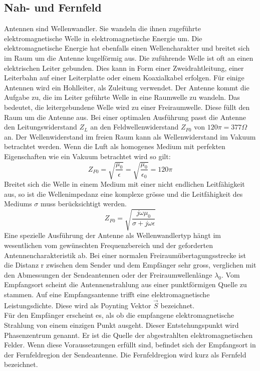 \newpage
\subsection{Nah- und Fernfeld}
Antennen sind Wellenwandler. Sie wandeln die ihnen zugeführte elektromagnetische Welle in  elektromagnetische Energie um. Die elektromagnetische Energie hat ebenfalls einen Wellencharakter und breitet  sich im Raum um die Antenne kugelförmig aus. Die zuführende Welle ist oft an einen elektrischen Leiter gebunden. Dies kann in Form einer Zweidrahtleitung, einer Leiterbahn auf einer Leiterplatte oder einem Koaxialkabel erfolgen.  Für einige Antennen wird ein Hohlleiter, als Zuleitung verwendet. 
Der Antenne kommt die Aufgabe zu, die im Leiter geführte Welle in eine Raumwelle zu wandeln. Das bedeutet, die leitergebundene Welle wird zu einer Freiraumwelle. Diese füllt den Raum um die Antenne aus. 
Bei einer optimalen Ausführung passt die Antenne den Leitungswiderstand $Z_{L}$ an den Feldwellenwiderstand $Z_{F0}$ von $120\pi = 377 \Omega$ an. Der Wellenwiderstand im freien Raum kann als Wellenwiderstand im Vakuum betrachtet werden. Wenn die Luft als homogenes Medium mit perfekten Eigenschaften wie ein Vakuum betrachtet wird so gilt:
\begin{equation}\label{eq:Wellenimpedanz}
Z_{F0}=\sqrt{\dfrac{\mu_{0}}{\epsilon}}=\sqrt{\dfrac{\mu_{0}}{\epsilon_{0}}}=120\pi
\end{equation}
Breitet sich die Welle in einem Medium mit einer nicht endlichen Leitfähigkeit aus, so ist die Wellenimpedanz eine komplexe grösse und die Leitfähigkeit des Mediums $\sigma$ muss berücksichtigt werden.
\begin{equation}\label{eq:Wellenimpedanz}
Z_{F0}=\sqrt{\dfrac{j\omega\mu_{0}}{\sigma+j\omega\epsilon}}
\end{equation}
Eine spezielle Ausführung der Antenne als Wellenwandlertyp hängt im wesentlichen vom gewünschten Frequenzbereich und der geforderten Antennencharakteristik ab. Bei einer normalen Freiraumübertagungsstrecke ist die Distanz r zwischen dem Sender und dem Empfänger sehr gross, verglichen mit den Abmessungen der Sendeantennen oder der Freiraumwellenlänge $\lambda_{0}$. Vom Empfangsort scheint die Antennenstrahlung  aus einer punktförmigen Quelle zu stammen. Auf eine Empfangsantenne trifft eine  elektromagnetische Leistungsdichte. Diese wird als Poynting Vektor $\vec{S}$ bezeichnet.\\
Für den Empfänger erscheint es, als ob die empfangene elektromagnetische Strahlung von einem einzigen Punkt ausgeht. Dieser Entstehungspunkt wird Phasenzentrum genannt. Er ist die Quelle der abgestrahlten elektromagnetischen Felder. Wenn diese Voraussetzungen erfüllt sind, befindet sich der Empfangsort in der Fernfeldregion der Sendeantenne. Die Fernfeldregion wird kurz als Fernfeld bezeichnet. 
